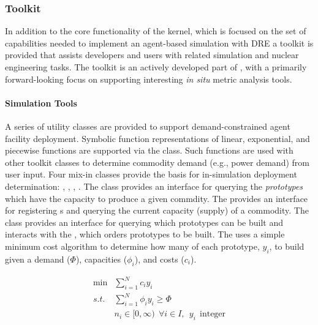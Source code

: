 \subsubsection{Toolkit}

In addition to the core functionality of the \Cyclus kernel, which is focused on
the set of capabilities needed to implement an agent-based simulation
with \gls{DRE} a toolkit is provided that assists developers
and users with related simulation and nuclear engineering tasks. The toolkit is
an actively developed part of \Cyclus, with a primarily forward-looking
focus on supporting interesting \textit{in situ} metric analysis tools. 

\paragraph{Simulation Tools}

A series of utility classes are provided to support demand-constrained agent
facility deployment. Symbolic function representations of linear,
exponential, and piecewise functions are supported via the
 class. Such functions are used with other toolkit
classes to determine commodity demand (e.g., power demand) from user input. Four
mix-in classes provide the basis for in-simulation deployment determination:
, , ,
. The  class provides an
interface for querying the \textit{prototypes} which have the
capacity to produce a given commdity. The 
provides an interface for registering s and querying
the current capacity (supply) of a commodity. The  class provides
an interface for querying which prototypes can be built and interacts with the
, which orders prototypes to be built. The
 uses a simple minimum cost algorithm to determine how
many of each prototype, $y_i$, to build given a demand ($\Phi$), capacities
($\phi_i$), and costs ($c_i$).

\begin{equation}
\begin{aligned}
 \min & \sum_{i=1}^{N}c_i y_i \\
 s.t. & \sum_{i=1}^{N}\phi_i y_i \ge \Phi \\
      & n_i \in [0,\infty) \:\: \forall i \in I, \:\: y_i \:\: \text{integer} 
\end{aligned}
\end{equation}

